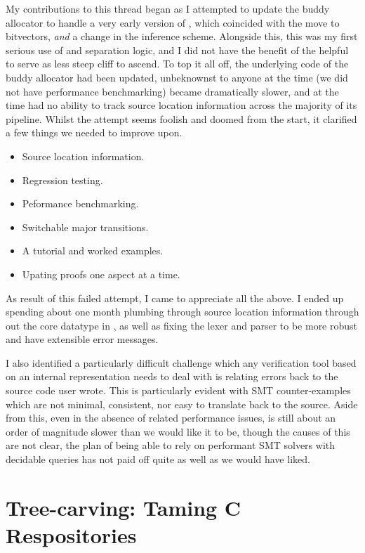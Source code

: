My contributions to this thread began as I attempted to update the buddy
allocator to handle a very early version of , which coincided with the
move to bitvectors, \emph{and} a change in the inference scheme. Alongside
this, this was my first serious use of  and separation logic, and I did
not have the benefit of the helpful  to serve as less steep
cliff to ascend. To top it all off, the underlying code of the buddy allocator
had been updated, unbeknownst to anyone at the time (we did not have
performance benchmarking)  became dramatically slower, and at the time
had no ability to track source location information across the majority of its
pipeline. Whilst the attempt seems foolish and doomed from the start, it
clarified a few things we needed to improve upon.
\begin{itemize}
    \item Source location information.
    \item Regression testing.
    \item Peformance benchmarking.
    \item Switchable major transitions.
    \item A tutorial and worked examples.
    \item Upating proofs one aspect at a time.
\end{itemize}

As result of this failed attempt, I came to appreciate all the above. I ended
up spending about one month plumbing through source location information
through out the core datatype in , as well as fixing the lexer and
parser to be more robust and have extensible error messages.

I also identified a particularly difficult challenge which any verification
tool based on an internal representation needs to deal with is relating errors
back to the source code user wrote. This is particularly evident with SMT
counter-examples which are not minimal, consistent, nor easy to translate back
to the source. Aside from this, even in the absence of  related
performance issues,  is still about an order of magnitude slower than we
would like it to be, though the causes of this are not clear, the plan of being
able to rely on performant SMT solvers with decidable queries has not paid off
quite as well as we would have liked.

\chapter{Tree-carving: Taming C Respositories}\label{chap:tree-carver}

